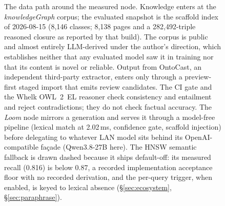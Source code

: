\begin{figure}[t]
{}
\caption{The data path around the measured node. Knowledge enters at the \emph{knowledgeGraph} corpus;
the evaluated snapshot is the scaffold index of 2026-08-15 (8{,}146 classes; 8{,}138 pages and a
282{,}492-triple reasoned closure as reported by that build). The corpus is public and almost entirely
LLM-derived under the author's direction, which establishes neither that any evaluated model saw it in
training nor that its content is novel or reliable. Output from OntoCast, an independent third-party
extractor, enters only through a preview-first staged import that emits review candidates. The CI gate and
the Whelk OWL~2~EL reasoner check consistency and entailment and reject contradictions; they do not check
factual accuracy. The \emph{Loom} node mirrors a generation and serves it through a model-free pipeline
(lexical match at 2.02\,ms, confidence gate, scaffold injection) before delegating to whatever LAN model sits
behind its OpenAI-compatible fa\c{c}ade (Qwen3.8-27B here). The HNSW semantic fallback is drawn dashed
because it ships default-off: its measured recall (0.816) is below 0.87, a recorded implementation
acceptance floor with no recorded derivation, and the per-query trigger, when enabled, is keyed to
lexical absence (\S\ref{sec:ecosystem}, \S\ref{sec:paraphrase}).}
\label{fig:ecosystem}
\end{figure}
